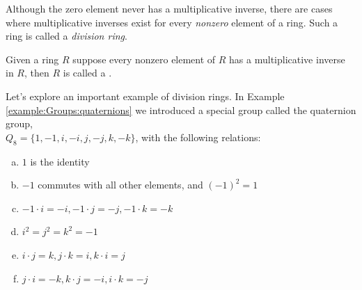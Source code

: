 %


Although the zero element never has a multiplicative inverse, there are cases where multiplicative inverses exist for every \emph{nonzero} element of a ring. Such a ring is called a \emph{division ring}. 

\begin{defn} \label{def:divisionring}
Given a ring $R$ suppose every nonzero element of $R$ has a multiplicative inverse in $R$, then $R$ is called a .
\end{defn}

Let's explore an important example of division rings.  In Example \ref{example:Groups:quaternions} we introduced a special group called the quaternion group,\\ $Q_8=\{1,-1,i,-i,j,-j,k,-k\}$, with the following relations:
\begin{enumerate}[(a)]
\item
$1$ is the identity
\item
$-1$ commutes with all other elements, and $(-1)^2=1$
\item
$-1 \cdot i = -i, -1 \cdot j = -j, -1 \cdot k = -k$
\item
$i^2 = j^2=k^2 = -1$
\item
$i \cdot j = k, j \cdot k = i, k \cdot i=j$
\item
$j \cdot i = -k, k \cdot j=-i, i \cdot k = -j$ 
\end{enumerate}


